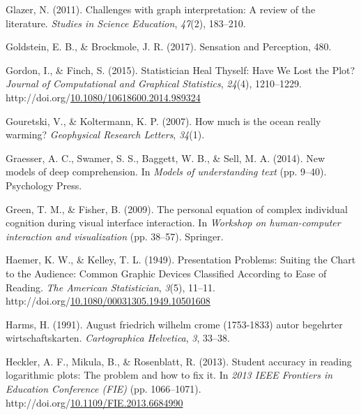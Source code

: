 \documentclass[print]{nuthesis}
\newlength{\cslhangindent}
\newenvironment{CSLReferences}%
{\setlength{\parindent}{0pt}%
\everypar{\setlength{\hangindent}{\cslhangindent}}\ignorespaces}%
{\par}
\begin{document}
\begin{CSLReferences}{1}{0}
\leavevmode{}%
Glazer, N. (2011). Challenges with graph interpretation: A review of the literature. \emph{Studies in Science Education}, \emph{47}(2), 183--210.

\leavevmode{}%
Goldstein, E. B., \& Brockmole, J. R. (2017). Sensation and {Perception}, 480.

\leavevmode{}%
Gordon, I., \& Finch, S. (2015). Statistician {Heal} {Thyself}: {Have} {We} {Lost} the {Plot}? \emph{Journal of Computational and Graphical Statistics}, \emph{24}(4), 1210--1229. http://doi.org/\href{https://doi.org/10.1080/10618600.2014.989324}{10.1080/10618600.2014.989324}

\leavevmode{}%
Gouretski, V., \& Koltermann, K. P. (2007). How much is the ocean really warming? \emph{Geophysical Research Letters}, \emph{34}(1).

\leavevmode{}%
Graesser, A. C., Swamer, S. S., Baggett, W. B., \& Sell, M. A. (2014). New models of deep comprehension. In \emph{Models of understanding text} (pp. 9--40). Psychology Press.

\leavevmode{}%
Green, T. M., \& Fisher, B. (2009). The personal equation of complex individual cognition during visual interface interaction. In \emph{Workshop on human-computer interaction and visualization} (pp. 38--57). Springer.

\leavevmode{}%
Haemer, K. W., \& Kelley, T. L. (1949). Presentation {Problems}: {Suiting} the {Chart} to the {Audience}: {Common} {Graphic} {Devices} {Classified} {According} to {Ease} of {Reading}. \emph{The American Statistician}, \emph{3}(5), 11--11. http://doi.org/\href{https://doi.org/10.1080/00031305.1949.10501608}{10.1080/00031305.1949.10501608}

\leavevmode{}%
Harms, H. (1991). August friedrich wilhelm crome (1753-1833) autor begehrter wirtschaftskarten. \emph{Cartographica Helvetica}, \emph{3}, 33--38.

\leavevmode{}%
Heckler, A. F., Mikula, B., \& Rosenblatt, R. (2013). Student accuracy in reading logarithmic plots: {The} problem and how to fix it. In \emph{2013 {IEEE} {Frontiers} in {Education} {Conference} ({FIE})} (pp. 1066--1071). http://doi.org/\href{https://doi.org/10.1109/FIE.2013.6684990}{10.1109/FIE.2013.6684990}


\end{CSLReferences}
\end{document}
